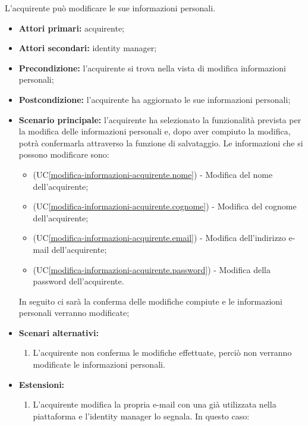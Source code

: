 
\label{modifica-informazioni-acquirente}

L'acquirente può modificare le sue informazioni personali.
\begin{itemize}
    \item \textbf{Attori primari:} acquirente;
    \item \textbf{Attori secondari:} identity manager;
    \item \textbf{Precondizione:} l'acquirente si trova nella vista di modifica informazioni personali;
    \item \textbf{Postcondizione:} l'acquirente ha aggiornato le sue informazioni personali;
    \item \textbf{Scenario principale:} l'acquirente ha selezionato la funzionalità prevista per la modifica delle informazioni personali e, dopo aver compiuto la modifica, potrà confermarla attraverso la funzione di salvataggio. Le informazioni che si possono modificare sono:
    \begin{itemize}
        \item (UC\ref{modifica-informazioni-acquirente.nome}) - Modifica del nome dell'acquirente;
        \item (UC\ref{modifica-informazioni-acquirente.cognome}) - Modifica del cognome dell'acquirente;
        \item (UC\ref{modifica-informazioni-acquirente.email}) - Modifica dell'indirizzo e-mail dell'acquirente;
        \item (UC\ref{modifica-informazioni-acquirente.password}) - Modifica della password dell'acquirente.
    \end{itemize}
    In seguito ci sarà la conferma delle modifiche compiute e le informazioni personali verranno modificate;
    \item \textbf{Scenari alternativi:}
    \begin{enumerate}[label=\lett]
        \item L'acquirente non conferma le modifiche effettuate, perciò non verranno modificate le informazioni personali.
    \end{enumerate}
    \item \textbf{Estensioni:} 
    \begin{enumerate}[label=\lett]
        \item L'acquirente modifica la propria e-mail con una già utilizzata nella piattaforma e l'identity manager lo segnala. In questo caso:

\end{enumerate}
\end{itemize}
